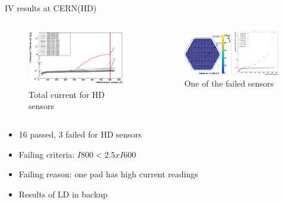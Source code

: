 \documentclass{beamer}
\begin{document}
\begin{frame}{IV results at CERN(HD) }
   \begin{columns}
        \begin{figure}
            \includegraphics[width=1.0\textwidth]{plots/HD_totalIV.png}
            \caption{Total current for HD sensors}
        \end{figure}

        \begin{figure}
            \includegraphics[width=1.0\textwidth]{plots/failedSensor_HD.png}
            \caption{One of the failed sensors}
        \end{figure}

    \end{columns}

    \begin{itemize}
        \item \alert{16 passed}, \alert{3 failed} for HD sensors
        \item Failing criteria: $ I800 < 2.5 x I600 $
        \item Failing reason: one pad has high current readings
        \item Results of LD in backup
    \end{itemize}

\end{frame}
\end{document}
